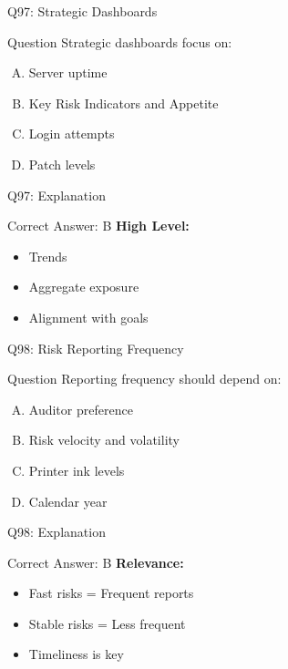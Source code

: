 \documentclass{beamer}
\begin{document}
			\begin{frame}{Q97: Strategic Dashboards}
				\begin{block}{Question}
					Strategic dashboards focus on:
				\end{block}
				\begin{enumerate}[(A)]
					\item Server uptime
					\item Key Risk Indicators and Appetite
					\item Login attempts
					\item Patch levels
				\end{enumerate}
			\end{frame}
			\begin{frame}{Q97: Explanation}
				\begin{block}{Correct Answer: B}
					\textbf{High Level:}
					\begin{itemize}
						\item Trends
						\item Aggregate exposure
						\item Alignment with goals
					\end{itemize}
				\end{block}
			\end{frame}
			
			\begin{frame}{Q98: Risk Reporting Frequency}
				\begin{block}{Question}
					Reporting frequency should depend on:
				\end{block}
				\begin{enumerate}[(A)]
					\item Auditor preference
					\item Risk velocity and volatility
					\item Printer ink levels
					\item Calendar year
				\end{enumerate}
			\end{frame}
			\begin{frame}{Q98: Explanation}
				\begin{block}{Correct Answer: B}
					\textbf{Relevance:}
					\begin{itemize}
						\item Fast risks = Frequent reports
						\item Stable risks = Less frequent
						\item Timeliness is key
					\end{itemize}
				\end{block}
			\end{frame}
			
\end{document}
